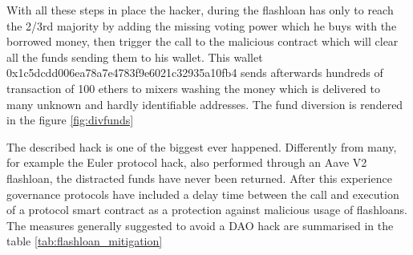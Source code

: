 \documentclass[11pt,a4paper,titlepage]{scrartcl}
\begin{document}
With all these steps in place the hacker, during the flashloan has only to reach the 2/3rd majority by adding the missing voting power which he buys with the borrowed money, then trigger the call to the malicious contract which will clear all the funds sending them to his wallet.
This wallet 0x1c5dcdd006ea78a7e4783f9e6021c32935a10fb4 sends afterwards hundreds of transaction of 100 ethers to mixers washing the money which is delivered to many unknown and hardly identifiable addresses.
The fund diversion is rendered in the figure \ref{fig:divfunds}






The described hack is one of the biggest ever happened. Differently from many, for example the Euler protocol hack, also performed through an Aave V2 flashloan, the distracted funds have never been returned.
After this experience governance protocols have included a delay time between the call and  execution of a protocol smart contract as a protection against malicious usage of flashloans.
The measures generally suggested to avoid a DAO hack are summarised in the table \ref{tab:flashloan_mitigation}
\end{document}
